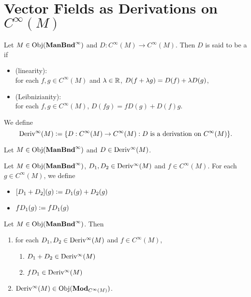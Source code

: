 \documentclass{book}
\begin{document}
\newpage
\section{Vector Fields as Derivations on $C^{\infty}(M)$}

\begin{defn}
	Let $M \in \operatorname{Obj}(\operatorname*{\text{\textbf{ManBnd}}^{\infty}})$ and $D: C^{\infty}(M) \rightarrow C^{\infty}(M)$. Then $D$ is said to be a  if 
	\begin{itemize}
		\item (linearity): \\
		for each $f,g \in C^{\infty}(M)$ and $\lambda \in \mathbb{R}$, $D(f + \lambda g) = D(f) + \lambda D(g)$,
		\item (Leibnizianity): \\
		for each $f,g \in C^{\infty}(M)$, $D(fg) = fD(g) + D(f)g$.
	\end{itemize}
	We define 
	$$\operatorname{Deriv^{\infty}}(M) \vcentcolon= \{D: C^{\infty}(M) \rightarrow C^{\infty}(M): D \text{ is a derivation on $C^{\infty}(M)$}\}.$$
\end{defn}

\begin{ex}
	Let $M \in \operatorname{Obj}(\operatorname*{\text{\textbf{ManBnd}}^{\infty}})$ and $D \in \operatorname{Deriv^{\infty}}(M)$.
\end{ex}

\begin{defn}
	Let $M \in \operatorname{Obj}(\operatorname*{\text{\textbf{ManBnd}}^{\infty}})$, $D_1, D_2 \in \operatorname{Deriv^{\infty}}(M)$ and $f \in C^{\infty}(M)$. For each $g \in C^{\infty}(M)$, we define 
	\begin{itemize}
		\item $[D_1 + D_2] (g) \vcentcolon= D_1(g) + D_2(g)$
		\item $f D_1 (g) \vcentcolon= f D_1(g)$
	\end{itemize}
\end{defn}

\begin{ex} 
	Let $M \in \operatorname{Obj}(\operatorname*{\text{\textbf{ManBnd}}^{\infty}})$. Then
	\begin{enumerate}
		\item for each $D_1, D_2 \in \operatorname{Deriv^{\infty}}(M)$ and $f \in C^{\infty}(M)$, 
		\begin{enumerate}
			\item $D_1 + D_2 \in \operatorname{Deriv^{\infty}}(M)$
			\item $f D_1 \in \operatorname{Deriv^{\infty}}(M)$
		\end{enumerate}
		\item $\operatorname{Deriv^{\infty}}(M) \in \operatorname{Obj}(\operatorname*{\text{\textbf{Mod}}}_{C^{\infty}(M)})$.
	\end{enumerate}
\end{ex}
\end{document}
